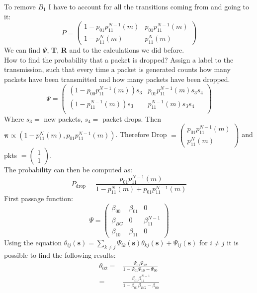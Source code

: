To remove $B_1$ I have to account for all the transitions coming from and going to it: \\
$$P =
\begin{pmatrix}
		1-p_{01}p_{11}^{N-1}(m) & p_{01}p_{11}^{N-1}(m) \\
		1-p_{11}^N(m) & p_{11}^N(m)
\end{pmatrix}$$
We can find $\Psi$, \textbf{T}, \textbf{R} and to the calculations we did before. \\
How to find the probability that a packet is dropped?
Assign a label to the transmission, such that every time a packet is generated counts how many packets have been transmitted and how many packets have been dropped.
$$\Psi=
\begin{pmatrix}
	 (1- p_{00}p_{11}^{N-1}(m))s_3 & p_{01}p_{11}^{N-1}(m)s_3s_4 \\
	 (1- p_{11}^{N-1}(m))s_3 & p_{11}^{N-1}(m)s_3s_4 \\
\end{pmatrix} $$
Where $s_3 =$ new packets, $s_4 =$ packet drops. Then $\mathbf{\pi} \propto (1-p_{11}^N(m),p_{01}p_{11}^{N-1}(m))$.
Therefore Drop $= \begin{pmatrix} p_{01}p_{11}^{N-1}(m) \\ p_{11}^N(m) \end{pmatrix}$ and pkts $= \begin{pmatrix} 1 \\ 1 \end{pmatrix}$.\\
The probability can then be computed as:
\begin{equation}
	P_{\text{drop}} = \frac{p_{01}p_{11}^{N-1}(m)}{1-p_{11}^N(m) + p_{01}p_{11}^{N-1}(m)}
\end{equation}
First passage function:
$$\Psi=
\begin{pmatrix}
	 \beta_{00} & \beta_{01} & 0 \\
	 \beta_{BG} & 0 & \beta_{11}^{N-1} \\
	 \beta_{10} & \beta_{11} & 0
\end{pmatrix} $$
Using the equation $\theta_{ij}(\textbf{s}) = \sum_{k \neq j} \Psi_{ik}(\textbf{s})\theta_{kj}(\textbf{s}) + \Psi_{ij}(\textbf{s})$ for $i\neq j$ it is possible to find the following results:
\begin{equation*}
	\begin{split}
		\theta_{02} = & \frac{\Psi_{01}\Psi_{12}}{1 - \Psi_{01}\Psi_{10} - \Psi_{00}}\\
		= & \frac{\beta_{01}\beta_{11}^{N-1}}{1- \beta_{01}\beta_{BG}-\beta_{00}}
	\end{split}
\end{equation*}
